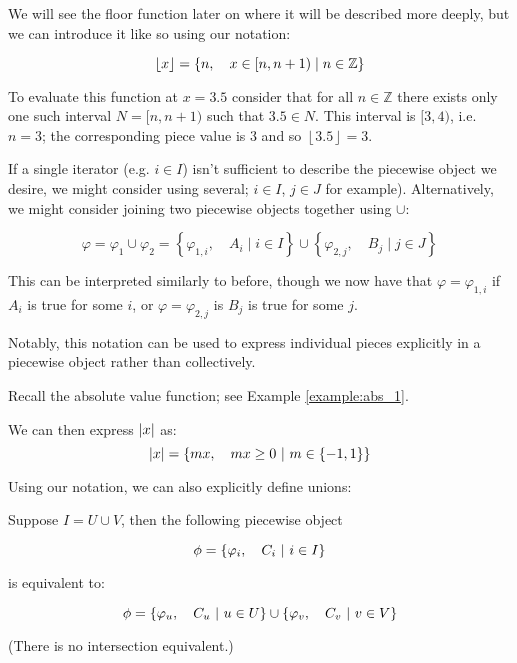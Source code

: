 \begin{example}
    We will see the floor function later on where it will be described more deeply, but we can introduce it like so using our notation:

    $$
        \lfloor x\rfloor=\left\{n,\quad x\in[n,n+1)\mid n\in\mathbb{Z}\right\}
    $$

    To evaluate this function at $x=3.5$ consider that for all $n\in\mathbb{Z}$ there exists only one such interval $N=[n,n+1)$ such that $3.5\in N$. This interval is $[3,4)$, i.e. $n=3$; the corresponding piece value is $3$ and so $\left\lfloor 3.5\right\rfloor=3$.
\end{example}

If a single iterator (e.g. $i\in I$) isn't sufficient to describe the piecewise object we desire, we might consider using several; $i\in I$, $j\in J$ for example). Alternatively, we might consider joining two piecewise objects together using $\cup$:

$$
    \varphi = \varphi_1 \cup \varphi_2 = \left\{\varphi_{1,i},\quad A_i\mid i\in I\right\}\cup\left\{\varphi_{2,j},\quad B_j\mid j\in J\right\}
$$

This can be interpreted similarly to before, though we now have that $\varphi=\varphi_{1,i}$ if $A_i$ is true for some $i$, or $\varphi=\varphi_{2,j}$ is $B_j$ is true for some $j$.

Notably, this notation can be used to express individual pieces explicitly in a piecewise object rather than collectively.

\begin{example}
    \label{example:abs_2}

    Recall the absolute value function; see Example \ref{example:abs_1}.

    We can then express $\abs{x}$ as:
    $$
        \abs{x} = \left\{mx,\quad mx\geq 0\ \middle|\ m\in\{-1,1\}\right\}
    $$
\end{example}

\begin{theorem}
    Using our notation, we can also explicitly define unions:

    Suppose $I=U\cup V$, then the following piecewise object

    $$
        \phi=\left\{\varphi_i,\quad C_i\ \middle|\ i\in I\right\}
    $$

    is equivalent to:

    $$
        \phi=\left\{\varphi_u,\quad C_u\ \middle|\ u\in U\right\}\cup\left\{\varphi_v,\quad C_v\ \middle|\ v\in V\right\}
    $$

    (There is no intersection equivalent.)
\end{theorem}

\newpage